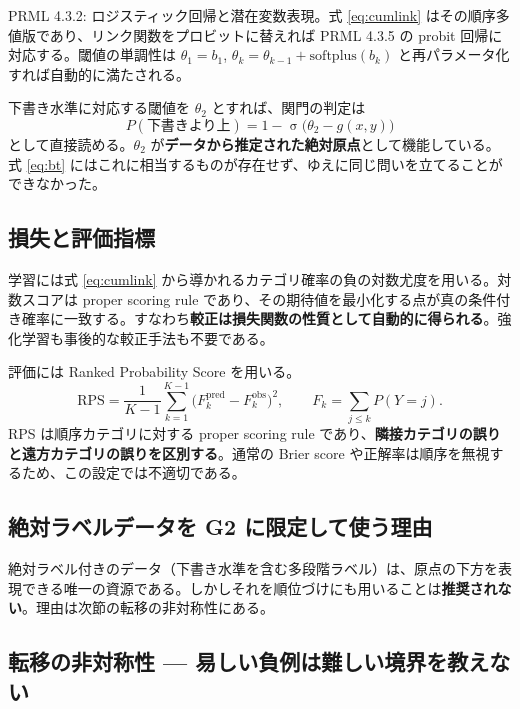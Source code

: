 \documentclass[a4paper,10.5pt]{ltjsarticle}
\newcommand{\prml}[1]{%
  \par\vspace{5pt}%
  \noindent\hspace*{1.6em}%
  \begin{minipage}{\dimexpr\linewidth-3.2em\relax}
    \color{black!55}\sffamily\footnotesize #1
  \end{minipage}%
  \par\vspace{6pt}}
\newcommand{\sg}{\operatorname{\sigma}}
\begin{document}
\prml{PRML 4.3.2: ロジスティック回帰と潜在変数表現。式 \eqref{eq:cumlink} はその順序多値版であり、リンク関数をプロビットに替えれば PRML 4.3.5 の probit 回帰に対応する。閾値の単調性は $\theta_1 = b_1$, $\theta_k = \theta_{k-1} + \mathrm{softplus}(b_k)$ と再パラメータ化すれば自動的に満たされる。}

下書き水準に対応する閾値を $\theta_2$ とすれば、関門の判定は
\begin{equation}
  P(\text{下書きより上}) = 1 - \sg\!\bigl(\theta_2 - g(x,y)\bigr)
  \label{eq:gate}
\end{equation}
として直接読める。$\theta_2$ が\textbf{データから推定された絶対原点}として機能している。式 \eqref{eq:bt} にはこれに相当するものが存在せず、ゆえに同じ問いを立てることができなかった。

\subsection{損失と評価指標}

学習には式 \eqref{eq:cumlink} から導かれるカテゴリ確率の負の対数尤度を用いる。対数スコアは proper scoring rule であり、その期待値を最小化する点が真の条件付き確率に一致する。すなわち\textbf{較正は損失関数の性質として自動的に得られる}。強化学習も事後的な較正手法も不要である。

評価には Ranked Probability Score を用いる。
\begin{equation}
  \mathrm{RPS} = \frac{1}{K-1}\sum_{k=1}^{K-1}\bigl(F_k^{\mathrm{pred}} - F_k^{\mathrm{obs}}\bigr)^2 ,
  \qquad F_k = \textstyle\sum_{j \le k} P(Y = j).
  \label{eq:rps}
\end{equation}
RPS は順序カテゴリに対する proper scoring rule であり、\textbf{隣接カテゴリの誤りと遠方カテゴリの誤りを区別する}。通常の Brier score や正解率は順序を無視するため、この設定では不適切である。

\subsection{絶対ラベルデータを G2 に限定して使う理由}

絶対ラベル付きのデータ（下書き水準を含む多段階ラベル）は、原点の下方を表現できる唯一の資源である。しかしそれを順位づけにも用いることは\textbf{推奨されない}。理由は次節の転移の非対称性にある。

\subsection{転移の非対称性 --- 易しい負例は難しい境界を教えない}
\end{document}
